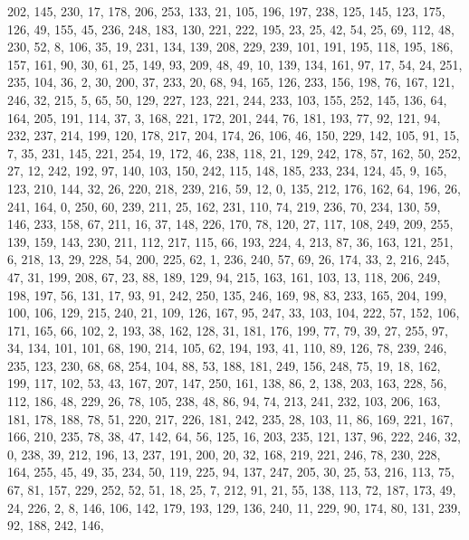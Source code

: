 \begin{DoxyCode}
       202, 145, 230, 17, 178, 206, 253, 133, 21, 105, 196, 197, 238, 125, 145, 123, 175, 126, 49, 155, 45, 236,
       248, 183, 130, 221, 222, 195, 23, 25, 42, 54, 25, 69, 112, 48, 230, 52, 8, 106, 35, 19, 231, 134, 139, 208,
       229, 239, 101, 191, 195, 118, 195, 186, 157, 161, 90, 30, 61, 25, 149, 93, 209, 48, 49, 10, 139, 134, 161,
       97, 17, 54, 24, 251, 235, 104, 36, 2, 30, 200, 37, 233, 20, 68, 94, 165, 126, 233, 156, 198, 76, 167, 121,
       246, 32, 215, 5, 65, 50, 129, 227, 123, 221, 244, 233, 103, 155, 252, 145, 136, 64, 164, 205, 191, 114, 37, 3,
       168, 221, 172, 201, 244, 76, 181, 193, 77, 92, 121, 94, 232, 237, 214, 199, 120, 178, 217, 204, 174, 26,
       106, 46, 150, 229, 142, 105, 91, 15, 7, 35, 231, 145, 221, 254, 19, 172, 46, 238, 118, 21, 129, 242, 178, 57,
       162, 50, 252, 27, 12, 242, 192, 97, 140, 103, 150, 242, 115, 148, 185, 233, 234, 124, 45, 9, 165, 123, 210,
       144, 32, 26, 220, 218, 239, 216, 59, 12, 0, 135, 212, 176, 162, 64, 196, 26, 241, 164, 0, 250, 60, 239, 211,
       25, 162, 231, 110, 74, 219, 236, 70, 234, 130, 59, 146, 233, 158, 67, 211, 16, 37, 148, 226, 170, 78, 120,
       27, 117, 108, 249, 209, 255, 139, 159, 143, 230, 211, 112, 217, 115, 66, 193, 224, 4, 213, 87, 36, 163, 121,
       251, 6, 218, 13, 29, 228, 54, 200, 225, 62, 1, 236, 240, 57, 69, 26, 174, 33, 2, 216, 245, 47, 31, 199, 208,
       67, 23, 88, 189, 129, 94, 215, 163, 161, 103, 13, 118, 206, 249, 198, 197, 56, 131, 17, 93, 91, 242, 250,
       135, 246, 169, 98, 83, 233, 165, 204, 199, 100, 106, 129, 215, 240, 21, 109, 126, 167, 95, 247, 33, 103, 104,
       222, 57, 152, 106, 171, 165, 66, 102, 2, 193, 38, 162, 128, 31, 181, 176, 199, 77, 79, 39, 27, 255, 97, 34,
       134, 101, 101, 68, 190, 214, 105, 62, 194, 193, 41, 110, 89, 126, 78, 239, 246, 235, 123, 230, 68, 68, 254,
       104, 88, 53, 188, 181, 249, 156, 248, 75, 19, 18, 162, 199, 117, 102, 53, 43, 167, 207, 147, 250, 161, 138,
       86, 2, 138, 203, 163, 228, 56, 112, 186, 48, 229, 26, 78, 105, 238, 48, 86, 94, 74, 213, 241, 232, 103,
       206, 163, 181, 178, 188, 78, 51, 220, 217, 226, 181, 242, 235, 28, 103, 11, 86, 169, 221, 167, 166, 210, 235,
       78, 38, 47, 142, 64, 56, 125, 16, 203, 235, 121, 137, 96, 222, 246, 32, 0, 238, 39, 212, 196, 13, 237, 191,
       200, 20, 32, 168, 219, 221, 246, 78, 230, 228, 164, 255, 45, 49, 35, 234, 50, 119, 225, 94, 137, 247, 205,
       30, 25, 53, 216, 113, 75, 67, 81, 157, 229, 252, 52, 51, 18, 25, 7, 212, 91, 21, 55, 138, 113, 72, 187, 173,
       49, 24, 226, 2, 8, 146, 106, 142, 179, 193, 129, 136, 240, 11, 229, 90, 174, 80, 131, 239, 92, 188, 242, 146,

\end{DoxyCode}
